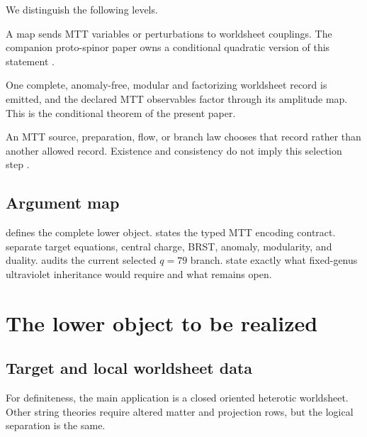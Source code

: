 \documentclass[11pt]{article}
\theoremstyle{definition}
\theoremstyle{remark}
\begin{document}
We distinguish the following levels.
\begin{description}[leftmargin=3.0cm,style=nextline]
\item[Local encoding]
A map sends MTT variables or perturbations to worldsheet couplings.  The
companion proto-spinor paper owns a conditional quadratic version of this
statement \cite{NeroProtoWorldsheet2026}.

\item[Perturbative realization]
One complete, anomaly-free, modular and factorizing worldsheet record is
emitted, and the declared MTT observables factor through its amplitude map.
This is the conditional theorem of the present paper.

\item[Physical selection]
An MTT source, preparation, flow, or branch law chooses that record rather
than another allowed record.  Existence and consistency do not imply this
selection step \cite{NeroHeteroticSelection2026}.
\end{description}

\subsection{Argument map}

 defines the complete lower object.
 states the typed MTT encoding contract.
 separate target equations, central charge,
BRST, anomaly, modularity, and duality.
 audits the current selected \(q=79\) branch.
 state exactly what fixed-genus ultraviolet
inheritance would require and what remains open.

\section{The lower object to be realized}
\label{sec:record}

\subsection{Target and local worldsheet data}

For definiteness, the main application is a closed oriented heterotic
worldsheet.  Other string theories require altered matter and projection
rows, but the logical separation is the same.
\end{document}
